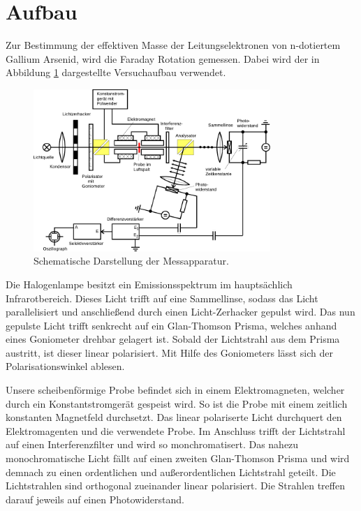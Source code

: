 \section{Aufbau}
\label{sec:Aufbau}

Zur Bestimmung der effektiven Masse der Leitungselektronen von n-dotiertem Gallium Arsenid, wird die Faraday Rotation
gemessen. Dabei wird der in Abbildung \ref{fig:apparatur} dargestellte Versuchaufbau verwendet.

\begin{figure}[H]
    \centering
    \includegraphics[width=0.8\textwidth]{content/grafik/apparatur.pdf}
    \caption{Schematische Darstellung der Messapparatur. \cite{faraday}}
    \label{fig:apparatur}
\end{figure}

Die Halogenlampe besitzt ein Emissionsspektrum im hauptsächlich Infrarotbereich. Dieses Licht trifft auf eine
Sammellinse, sodass das Licht parallelisiert und anschließend durch einen Licht-Zerhacker gepulst wird.
Das nun gepulste Licht trifft senkrecht auf ein Glan-Thomson Prisma, welches anhand eines Goniometer drehbar gelagert ist.
Sobald der Lichtstrahl aus dem Prisma austritt, ist dieser linear polarisiert. Mit Hilfe des Goniometers lässt sich 
der Polarisationswinkel ablesen. 

Unsere scheibenförmige Probe befindet sich in einem Elektromagneten, welcher durch ein Konstantstromgerät gespeist wird.
So ist die Probe mit einem zeitlich konstanten Magnetfeld durchsetzt.
Das linear polariserte Licht durchquert den Elektromagenten und die verwendete Probe.
Im Anschluss trifft der Lichtstrahl auf einen Interferenzfilter und wird so monchromatisert.
Das nahezu monochromatische Licht fällt auf einen zweiten Glan-Thomson Prisma und wird demnach
zu einen ordentlichen und außerordentlichen Lichtstrahl geteilt. Die Lichtstrahlen sind orthogonal zueinander linear polarisiert.
Die Strahlen treffen darauf jeweils auf einen Photowiderstand.

